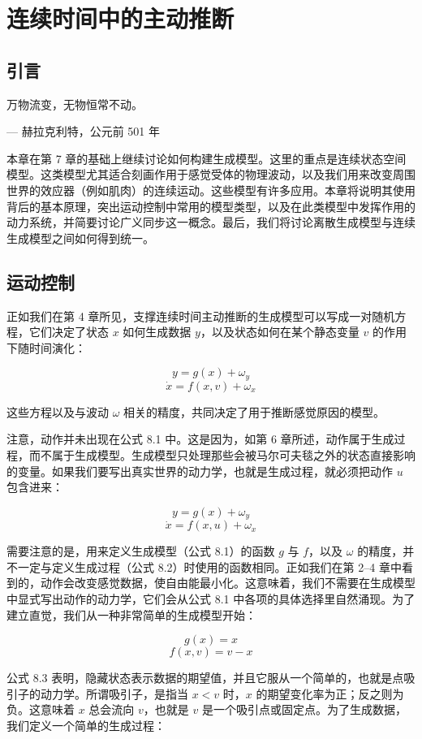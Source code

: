 \chapter{连续时间中的主动推断}
\section{引言}

万物流变，无物恒常不动。

\hfill --- 赫拉克利特，公元前 501 年

本章在第 7 章的基础上继续讨论如何构建生成模型。这里的重点是连续状态空间模型。这类模型尤其适合刻画作用于感觉受体的物理波动，以及我们用来改变周围世界的效应器（例如肌肉）的连续运动。这些模型有许多应用。本章将说明其使用背后的基本原理，突出运动控制中常用的模型类型，以及在此类模型中发挥作用的动力系统，并简要讨论广义同步这一概念。最后，我们将讨论离散生成模型与连续生成模型之间如何得到统一。

\section{运动控制}

正如我们在第 4 章所见，支撑连续时间主动推断的生成模型可以写成一对随机方程，它们决定了状态 $x$ 如何生成数据 $y$，以及状态如何在某个静态变量 $v$ 的作用下随时间演化：

\[
y = g(x) + \omega_y
\tag{8.1}
\]
\[
\dot{x} = f(x,v) + \omega_x
\]

这些方程以及与波动 $\omega$ 相关的精度，共同决定了用于推断感觉原因的模型。

注意，动作并未出现在公式 8.1 中。这是因为，如第 6 章所述，动作属于生成过程，而不属于生成模型。生成模型只处理那些会被马尔可夫毯之外的状态直接影响的变量。如果我们要写出真实世界的动力学，也就是生成过程，就必须把动作 $u$ 包含进来：

\[
y = g(x) + \omega_y
\tag{8.2}
\]
\[
\dot{x} = f(x,u) + \omega_x
\]

需要注意的是，用来定义生成模型（公式 8.1）的函数 $g$ 与 $f$，以及 $\omega$ 的精度，并不一定与定义生成过程（公式 8.2）时使用的函数相同。正如我们在第 2--4 章中看到的，动作会改变感觉数据，使自由能最小化。这意味着，我们不需要在生成模型中显式写出动作的动力学，它们会从公式 8.1 中各项的具体选择里自然涌现。为了建立直觉，我们从一种非常简单的生成模型开始：

\[
g(x) = x
\tag{8.3}
\]
\[
f(x,v) = v - x
\]

公式 8.3 表明，隐藏状态表示数据的期望值，并且它服从一个简单的，也就是点吸引子的动力学。所谓吸引子，是指当 $x < v$ 时，$x$ 的期望变化率为正；反之则为负。这意味着 $x$ 总会流向 $v$，也就是 $v$ 是一个吸引点或固定点。为了生成数据，我们定义一个简单的生成过程：

